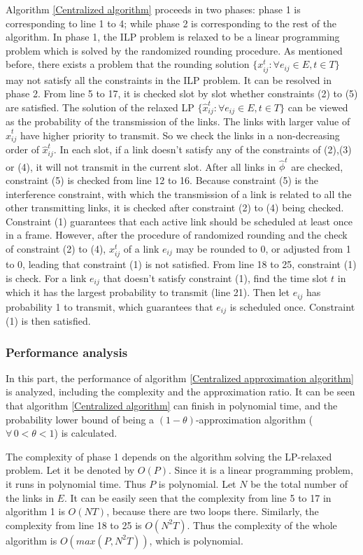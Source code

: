 \documentclass[conference]{IEEEtran}
\begin{document}
Algorithm \ref{Centralized algorithm} proceeds in two phases: phase
1 is corresponding to line 1 to 4; while phase 2 is corresponding to
the rest of the algorithm. In phase 1, the ILP problem is relaxed to
be a linear programming problem which is solved by the randomized
rounding procedure. As mentioned before, there exists a problem that
the rounding solution $\{x_{ij}^t:\forall e_{ij}\in E,t\in T\}$ may
not satisfy all the constraints in the ILP problem. It can be
resolved in phase 2. From line 5 to 17, it is checked slot by slot
whether constraints (2) to (5) are satisfied. The solution of the
relaxed LP $\{\hat{x}_{ij}^t:\forall e_{ij}\in E,t\in T\}$ can be
viewed as the probability of the transmission of the links. The
links with larger value of $\hat{x}_{ij}^t$ have higher priority to
transmit. So we check the links in a non-decreasing order of
$\hat{x}_{ij}^t$. In each slot, if a link doesn't satisfy any of the
constraints of (2),(3) or (4), it will not transmit in the current
slot. After all links in $\hat{\phi}^t$ are checked, constraint (5)
is checked from line 12 to 16. Because constraint (5) is the
interference constraint, with which the transmission of a link is
related to all the other transmitting links, it is checked after
constraint (2) to (4) being checked. Constraint (1) guarantees that
each active link should be scheduled at least once in a frame.
However, after the procedure of randomized rounding and the check of
constraint (2) to (4), $x_{ij}^t$ of a link $e_{ij}$ may be rounded
to 0, or adjusted from 1 to 0, leading that constraint (1) is not
satisfied. From line 18 to 25, constraint (1) is check. For a link
$e_{ij}$ that doesn't satisfy constraint (1), find the time slot $t$
in which it has the largest probability to transmit (line 21). Then
let $e_{ij}$ has probability 1 to transmit, which guarantees that
$e_{ij}$ is scheduled once. Constraint (1) is then satisfied.
\subsubsection{Performance analysis}
In this part, the performance of algorithm \ref{Centralized
approximation algorithm} is analyzed, including the complexity and
the approximation ratio. It can be seen that algorithm
\ref{Centralized algorithm} can finish in polynomial time, and the
probability lower bound of being a $(1-\theta)$-approximation
algorithm ($\forall \,0<\theta < 1$) is calculated.

The complexity of phase 1 depends on the algorithm solving the
LP-relaxed problem. Let it be denoted by $O(P)$. Since it is a
linear programming problem, it runs in polynomial time. Thus $P$ is
polynomial. Let $N$ be the total number of the links in $E$. It can
be easily seen that the complexity from line 5 to 17 in algorithm 1
is $O(NT)$, because there are two loops there. Similarly, the
complexity from line 18 to 25 is $O(N^2T)$. Thus the complexity of
the whole algorithm is $O(max(P,N^2T))$, which is polynomial.
\end{document}
